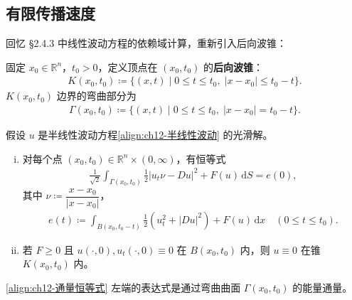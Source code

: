 \documentclass[../../main.tex]{subfiles}
\begin{document}
\subsection{有限传播速度}\label{subsection:ch12-有限传播速度}

回忆 \S2.4.3 中线性波动方程的依赖域计算，重新引入后向波锥：

\begin{definition}\label{definition:ch12-后向波锥}
固定 $x_0\in\mathbb{R}^n$，$t_0>0$，定义顶点在 $(x_0,t_0)$ 的\textbf{后向波锥}：
\begin{align*}
K(x_0,t_0)\coloneqq\{(x,t)\mid 0\leqslant t\leqslant t_0,\;|x-x_0|\leqslant t_0-t\}.
\end{align*}
$K(x_0,t_0)$ 边界的弯曲部分为
\begin{align*}
\Gamma(x_0,t_0)\coloneqq\{(x,t)\mid 0\leqslant t\leqslant t_0,\;|x-x_0|=t_0-t\}.
\end{align*}
\end{definition}

\begin{theorem}[半线性波动方程的通量估计。]\label{theorem:ch12-半线性波动通量估计}假设 $u$ 是半线性波动方程\eqref{align:ch12-半线性波动} 的光滑解。
\begin{enumerate}[(i)]
\item 对每个点 $(x_0,t_0)\in\mathbb{R}^n\times(0,\infty)$，有恒等式
\begin{align}
\frac{1}{\sqrt{2}}\int_{\Gamma(x_0,t_0)}\frac{1}{2}|u_t\nu-Du|^2+F(u)\,\mathrm{d}S=e(0),
\label{align:ch12-通量恒等式}
\end{align}
其中 $\nu\coloneqq\dfrac{x-x_0}{|x-x_0|}$，
\begin{align*}
e(t)\coloneqq\int_{B(x_0,t_0-t)}\frac{1}{2}(u_t^2+|Du|^2)+F(u)\,\mathrm{d}x \quad (0\leqslant t\leqslant t_0).
\end{align*}
\item 若 $F\geqslant 0$ 且 $u(\cdot,0),u_t(\cdot,0)\equiv 0$ 在 $B(x_0,t_0)$ 内，则 $u\equiv 0$ 在锥 $K(x_0,t_0)$ 内。
\end{enumerate}
\end{theorem}

\eqref{align:ch12-通量恒等式} 左端的表达式是通过弯曲曲面 $\Gamma(x_0,t_0)$ 的能量通量。
\end{document}
